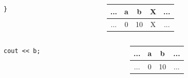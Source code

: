 \documentclass{beamer}
\begin{document}
\begin{frame}[fragile]
\begin{columns}[c]
\begin{column}{0.7\textwidth}
\begin{tabular}{ c | c | c | c | c}
\end{tabular}

  \end{column}
\end{columns}

\pause

\begin{columns}[c]
  \begin{column}{0.3\textwidth}
\begin{lstlisting}
}
\end{lstlisting}

  \end{column}
  \begin{column}{0.7\textwidth}
\begin{tabular}{ c | c | c | c | c}
\hline
... & a & b & \alert{X} &  ...\\\hline
... & 0 & 10 & \alert{X} &... \\\hline
  
\end{tabular}

  \end{column}
\end{columns}

\pause

\begin{columns}[c]
  \begin{column}{0.3\textwidth}
\begin{lstlisting}
cout << b;
\end{lstlisting}

  \end{column}
  \begin{column}{0.7\textwidth}
\begin{tabular}{ c | c | c | c}
\hline
... & a & b &  ...\\\hline
... & 0 & 10 & ... \\\hline
  
\end{tabular}

  \end{column}
\end{columns}

\end{frame}
\end{document}
